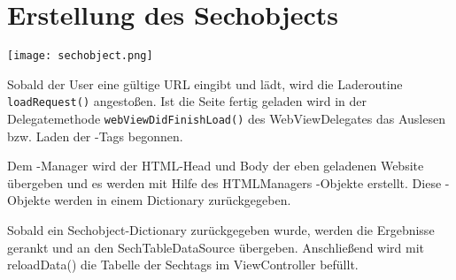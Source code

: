 \section{Erstellung des Sechobjects}

\texttt{[image: sechobject.png]}

Sobald der User eine gültige URL eingibt und lädt, wird die Laderoutine \Verb|loadRequest()|
angestoßen. Ist die Seite fertig geladen wird in der Delegatemethode \Verb|webViewDidFinishLoad()|
des WebViewDelegates das Auslesen bzw. Laden der \SEARCH-Tags begonnen.

Dem \SEARCH-Manager wird der HTML-Head und Body der eben geladenen Website übergeben und es
werden mit Hilfe des HTMLManagers \SEARCH-Objekte erstellt. Diese \SEARCH-Objekte werden in einem
Dictionary zurückgegeben.

Sobald ein Sechobject-Dictionary zurückgegeben wurde, werden die Ergebnisse gerankt und an den SechTableDataSource übergeben. Anschließend wird mit reloadData() die Tabelle der Sechtags im ViewController befüllt.

